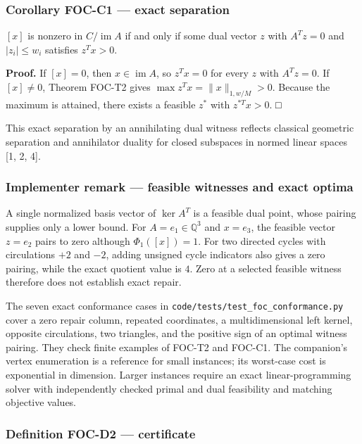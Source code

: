 \documentclass[
  11pt,
]{article}
\begin{document}
\subsubsection{Corollary FOC-C1 --- exact separation}\label{corollary-foc-c1-exact-separation}

\([x]\) is nonzero in \(C/\operatorname{im} A\) if and only if some dual vector \(z\) with \(A^T z=0\) and \(|z_i|\le w_i\) satisfies \(z^T x>0\).

\textbf{Proof.} If \([x]=0\), then \(x\in\operatorname{im} A\), so \(z^T x=0\) for every \(z\) with \(A^T z=0\). If \([x]\ne 0\), Theorem FOC-T2 gives \(\max z^T x=\|x\|_{1,w/M}>0\). Because the maximum is attained, there exists a feasible \(z^*\) with \(z^{*T} x>0\). □

This exact separation by an annihilating dual witness reflects classical geometric separation and annihilator duality for closed subspaces in normed linear spaces {[}1, 2, 4{]}.

\subsubsection{Implementer remark --- feasible witnesses and exact optima}\label{implementer-remark-feasible-witnesses-and-exact-optima}

A single normalized basis vector of \(\ker A^T\) is a feasible dual point, whose pairing supplies only a lower bound. For \(A=e_1\in\mathbb{Q}^3\) and \(x=e_3\), the feasible vector \(z=e_2\) pairs to zero although \(\Phi_1([x])=1\). For two directed cycles with circulations \(+2\) and \(-2\), adding unsigned cycle indicators also gives a zero pairing, while the exact quotient value is \(4\). Zero at a selected feasible witness therefore does not establish exact repair.

The seven exact conformance cases in \nolinkurl{code/tests/test_foc_conformance.py} cover a zero repair column, repeated coordinates, a multidimensional left kernel, opposite circulations, two triangles, and the positive sign of an optimal witness pairing. They check finite examples of FOC-T2 and FOC-C1. The companion's vertex enumeration is a reference for small instances; its worst-case cost is exponential in dimension. Larger instances require an exact linear-programming solver with independently checked primal and dual feasibility and matching objective values.

\subsubsection{Definition FOC-D2 --- certificate}\label{definition-foc-d2-certificate}
\end{document}
